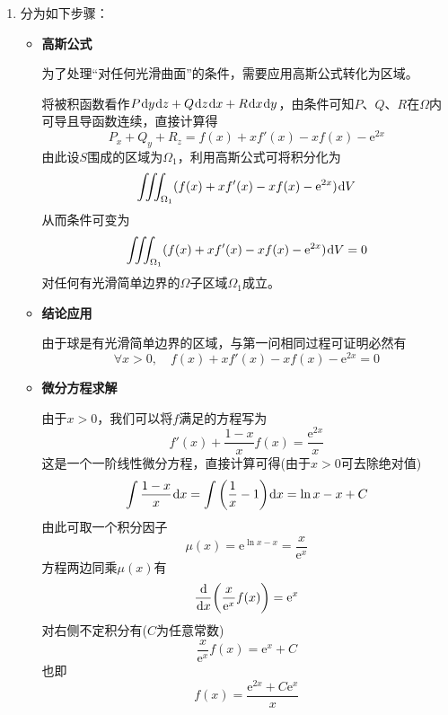 \documentclass[a4paper,UTF8,fontset=windows,AutoFakeBold]{ctexart}
\newcommand*{\dr}{\hspace{0.07em}\mathrm{d}}
\newcommand*{\er}{\mathrm{e}}
\newcommand*{\rb}{\mathbb{R}}
\theoremstyle{ex}
\begin{document}
\begin{enumerate}
\begin{enumerate}[(1)]
        由此，设$\gamma=\min\{\delta,\delta_0\}$，构造
        $$\Omega_1=\{(x,y,z)\in\rb^3\mid(x-x_0)^2+(y-y_0)^2+(z-z_0)^2<\gamma^2\}$$
        根据$\delta$与$\delta_0$的定义可知$\Omega_1\subset\Omega$，且其上$|f(x,y,z)-f(x_0,y_0,z_0)|<\frac{c}{2}$，从而
        $$f(x,y,z)>f(x_0,y_0,z_0)-\frac{c}{2}=\frac{c}{2}$$
        由此(等号是由于对常数重积分的几何意义为区域体积的倍数，而$\Omega_1$是半径为$\gamma$的球)
        $$\iiint_{\Omega_1}f(x,y,z)\dr x\dr y\dr z\ge\iiint_{\Omega_1}\frac{c}{2}\dr x\dr y\dr z=\frac{c}{2}\cdot\frac{4\pi}{3}\gamma^3>0$$
        矛盾。

        \item 分为如下步骤：
        \begin{itemize}
            \item \textbf{高斯公式}
            
            为了处理``对任何光滑曲面''的条件，需要应用高斯公式转化为区域。

            将被积函数看作$P\dr y\dr z+Q\dr z\dr x+R\dr x\dr y$，由条件可知$P$、$Q$、$R$在$\Omega$内可导且导函数连续，直接计算得
            $$P_x+Q_y+R_z=f(x)+xf'(x)-xf(x)-\er^{2x}$$
            由此设$S$围成的区域为$\Omega_1$，利用高斯公式可将积分化为
            $$\iiint_{\Omega_1}(f(x)+xf'(x)-xf(x)-\er^{2x})\dr V$$
            从而条件可变为
            $$\iiint_{\Omega_1}(f(x)+xf'(x)-xf(x)-\er^{2x})\dr V=0$$
            对任何有光滑简单边界的$\Omega$子区域$\Omega_1$成立。

            \item \textbf{结论应用}
            
            由于球是有光滑简单边界的区域，与第一问相同过程可证明必然有
            $$\forall x>0,\quad f(x)+xf'(x)-xf(x)-\er^{2x}=0$$

            \item \textbf{微分方程求解}
            
            由于$x>0$，我们可以将$f$满足的方程写为
            $$f'(x)+\frac{1-x}{x}f(x)=\frac{\er^{2x}}{x}$$
            这是一个一阶线性微分方程，直接计算可得(由于$x>0$可去除绝对值)
            $$\int\frac{1-x}{x}\dr x=\int\bigg(\frac{1}{x}-1\bigg)\dr x=\ln x-x+C$$
            由此可取一个积分因子
            $$\mu(x)=\er^{\ln x-x}=\frac{x}{\er^x}$$
            方程两边同乘$\mu(x)$有
            $$\frac{\dr}{\dr x}\bigg(\frac{x}{\er^x}f(x)\bigg)=\er^x$$
            对右侧不定积分有($C$为任意常数)
            $$\frac{x}{\er^x}f(x)=\er^x+C$$
            也即
            $$f(x)=\frac{\er^{2x}+C\er^x}{x}$$


\end{itemize}
\end{enumerate}
\end{enumerate}
\end{document}

